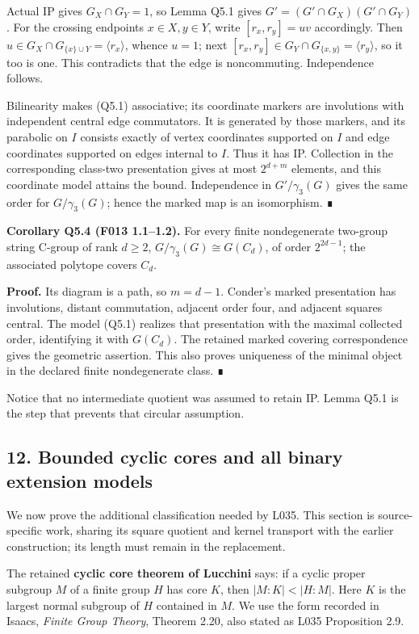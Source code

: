 \documentclass[
  10pt,
  letterpaper,
]{article}
\begin{document}
Actual IP gives \(G_X\cap G_Y=1\), so Lemma Q5.1 gives
\(G'=(G'\cap G_X)(G'\cap G_Y)\). For the crossing endpoints
\(x\in X,y\in Y\), write \([r_x,r_y]=uv\) accordingly. Then
\(u\in G_X\cap G_{\{x\}\cup Y}=\langle r_x\rangle\), whence \(u=1\);
next \([r_x,r_y]\in G_Y\cap G_{\{x,y\}}=\langle r_y\rangle\), so it too
is one. This contradicts that the edge is noncommuting. Independence
follows.

Bilinearity makes (Q5.1) associative; its coordinate markers are
involutions with independent central edge commutators. It is generated
by those markers, and its parabolic on \(I\) consists exactly of vertex
coordinates supported on \(I\) and edge coordinates supported on edges
internal to \(I\). Thus it has IP. Collection in the corresponding
class-two presentation gives at most \(2^{d+m}\) elements, and this
coordinate model attains the bound. Independence in \(G'/\gamma_3(G)\)
gives the same order for \(G/\gamma_3(G)\); hence the marked map is an
isomorphism. ∎

\textbf{Corollary Q5.4 (F013 1.1--1.2).} For every finite nondegenerate
two-group string C-group of rank \(d\ge2\),
\(G/\gamma_3(G)\cong G(C_d)\), of order \(2^{2d-1}\); the associated
polytope covers \(C_d\).

\textbf{Proof.} Its diagram is a path, so \(m=d-1\). Conder's marked
presentation has involutions, distant commutation, adjacent order four,
and adjacent squares central. The model (Q5.1) realizes that
presentation with the maximal collected order, identifying it with
\(G(C_d)\). The retained marked covering correspondence gives the
geometric assertion. This also proves uniqueness of the minimal object
in the declared finite nondegenerate class. ∎

Notice that no intermediate quotient was assumed to retain IP. Lemma
Q5.1 is the step that prevents that circular assumption.

\subsection{12. Bounded cyclic cores and all binary extension
models}\label{bounded-cyclic-cores-and-all-binary-extension-models}

We now prove the additional classification needed by L035. This section
is source-specific work, sharing its square quotient and kernel
transport with the earlier construction; its length must remain in the
replacement.

The retained \textbf{cyclic core theorem of Lucchini} says: if a cyclic
proper subgroup \(M\) of a finite group \(H\) has core \(K\), then
\(|M:K|<|H:M|\). Here \(K\) is the largest normal subgroup of \(H\)
contained in \(M\). We use the form recorded in Isaacs, \emph{Finite
Group Theory}, Theorem 2.20, also stated as L035 Proposition 2.9.
\end{document}
